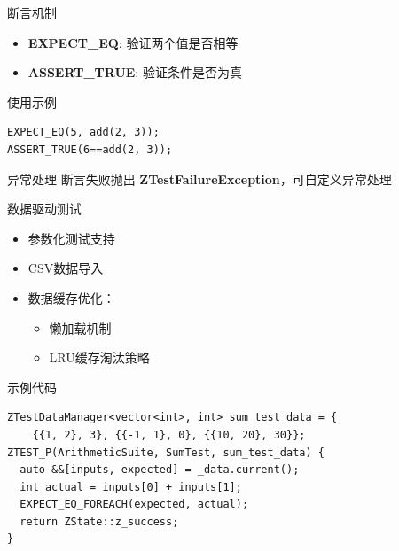\documentclass{beamer}
\begin{document}
\begin{frame}{断言机制}
    \begin{itemize}
        \item \textbf{EXPECT\_EQ}: 验证两个值是否相等
        \item \textbf{ASSERT\_TRUE}: 验证条件是否为真
    \end{itemize}

    \begin{exampleblock}{使用示例}
        \begin{lstlisting}[basicstyle=\ttfamily\small]
EXPECT_EQ(5, add(2, 3));
ASSERT_TRUE(6==add(2, 3));
        \end{lstlisting}
    \end{exampleblock}

    \begin{alertblock}{异常处理}
        断言失败抛出 \textbf{ZTestFailureException}，可自定义异常处理
    \end{alertblock}
\end{frame}

\begin{frame}{数据驱动测试}
    \begin{itemize}
        \item 参数化测试支持
        \item CSV数据导入
        \item 数据缓存优化：
              \begin{itemize}
                  \item 懒加载机制
                  \item LRU缓存淘汰策略
              \end{itemize}
    \end{itemize}

    \begin{exampleblock}{示例代码}
        \begin{lstlisting}[basicstyle=\ttfamily\small]
ZTestDataManager<vector<int>, int> sum_test_data = {
    {{1, 2}, 3}, {{-1, 1}, 0}, {{10, 20}, 30}};
ZTEST_P(ArithmeticSuite, SumTest, sum_test_data) {
  auto &&[inputs, expected] = _data.current();
  int actual = inputs[0] + inputs[1];
  EXPECT_EQ_FOREACH(expected, actual);
  return ZState::z_success;
}
        \end{lstlisting}
    \end{exampleblock}
\end{frame}
\end{document}

